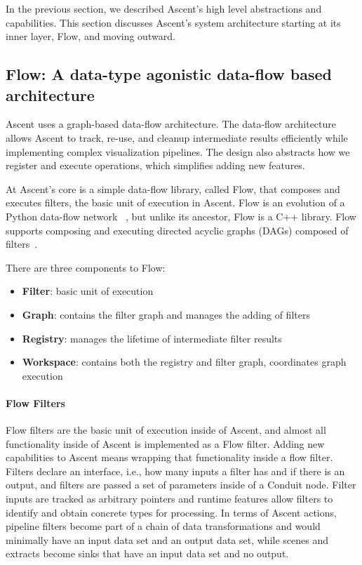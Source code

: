 In the previous section, we described Ascent's high level abstractions and
capabilities.
%
This section discusses Ascent's system architecture starting at its inner layer, Flow,
and moving outward.

\subsection{Flow: A data-type agonistic data-flow based architecture}
Ascent uses a graph-based data-flow architecture.
The data-flow architecture allows Ascent to track, re-use, and cleanup intermediate 
results efficiently while implementing complex visualization pipelines. 
The design also abstracts how we register and execute operations,
which simplifies adding new features. 

At Ascent's core is a simple data-flow library, called Flow, that
composes and executes filters, the basic unit of execution in Ascent.
%
Flow is an evolution of a Python data-flow network
~\cite{flow_reference}, but unlike its ancestor, Flow is a C++
library.
%
Flow supports composing and executing directed acyclic graphs
(DAGs) composed of filters~\cite{LarsenAscent}.

There are three components to Flow:
\begin{itemize}
  \item \textbf{Filter}: basic unit of execution
  \item \textbf{Graph}: contains the filter graph and manages the adding of filters
  \item \textbf{Registry}: manages the lifetime of intermediate filter results
  \item \textbf{Workspace}: contains both the registry and filter graph, coordinates graph execution 
\end{itemize}

\paragraph{Flow Filters}
Flow filters are the basic unit of execution inside of Ascent, and
almost all functionality inside of Ascent is implemented as a Flow filter.
%
Adding new capabilities to Ascent means wrapping that functionality inside
a flow filter.
%
Filters declare an interface, i.e., how many inputs a filter has and
if there is an output, and filters are passed a set of parameters inside
of a Conduit
node.
%
Filter inputs are tracked as arbitrary pointers and runtime features allow
filters to identify and obtain concrete types for processing.
%
In terms of Ascent actions, pipeline filters become part of a chain of
data transformations and would minimally have an input
data set and an output data set, while scenes and extracts
become sinks that have an input data set and no output.
%

